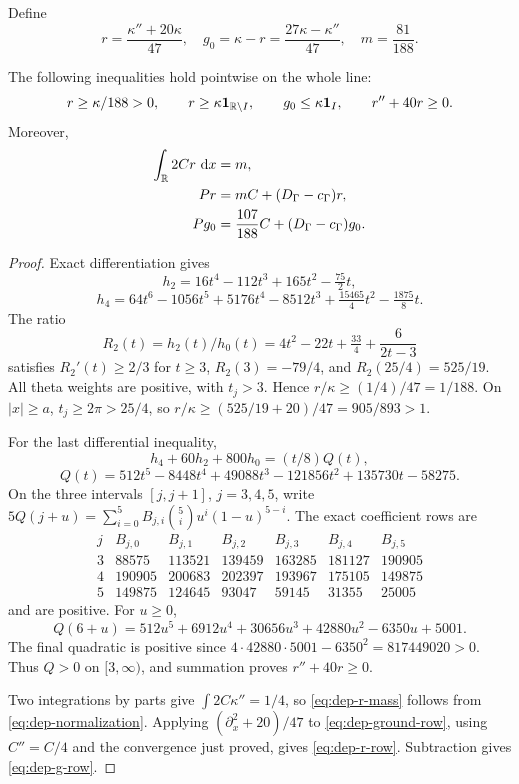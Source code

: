 Define
\[
 r=\frac{\kappa''+20\kappa}{47},\quad
 g_0=\kappa-r=\frac{27\kappa-\kappa''}{47},\quad m=\frac{81}{188}.
\]
\begin{lemma}\label{lem:dep-positive-source}
The following inequalities hold pointwise on the whole line:
\[
 r\ge\kappa/188>0,\qquad r\ge\kappa\mathbf1_{\mathbb R\setminus I},
 \qquad g_0\le\kappa\mathbf1_I,\qquad r''+40r\ge0.
\]
Moreover,
\begin{align}
 \int_{\mathbb R}2Cr\,\,\mathrm d x&=m,\label{eq:dep-r-mass}\\
 Pr&=mC+(D_\Gamma-c_\Gamma)r,\label{eq:dep-r-row}\\
 Pg_0&=\frac{107}{188}C+(D_\Gamma-c_\Gamma)g_0.
 \label{eq:dep-g-row}
\end{align}
\end{lemma}
\begin{proof}
Exact differentiation gives
\[
 h_2=16t^4-112t^3+165t^2-\tfrac{75}{2}t,
\]
\[
 h_4=64t^6-1056t^5+5176t^4-8512t^3
                 +\tfrac{15465}{4}t^2-\tfrac{1875}{8}t.
\]
The ratio
\[
 R_2(t)=h_2(t)/h_0(t)=4t^2-22t+\tfrac{33}{4}+\frac6{2t-3}
\]
satisfies $R_2'(t)\ge2/3$ for $t\ge3$,
$R_2(3)=-79/4$, and $R_2(25/4)=525/19$.
All theta weights are positive, with $t_j>3$. Hence
$r/\kappa\ge(1/4)/47=1/188$.
On $|x|\ge a$, $t_j\ge2\pi>25/4$, so
$r/\kappa\ge(525/19+20)/47=905/893>1$.

For the last differential inequality,
\[
 h_4+60h_2+800h_0=(t/8)Q(t),
\]
\[
 Q(t)=512t^5-8448t^4+49088t^3-121856t^2+135730t-58275.
\]
On the three intervals $[j,j+1]$, $j=3,4,5$, write
$5Q(j+u)=\sum_{i=0}^5 B_{j,i}\binom5i u^i(1-u)^{5-i}$.
The exact coefficient rows are
\[
\begin{array}{c|rrrrrr}
 j& B_{j,0}&B_{j,1}&B_{j,2}&B_{j,3}&B_{j,4}&B_{j,5}\\\hline
3&88575&113521&139459&163285&181127&190905\\
4&190905&200683&202397&193967&175105&149875\\
5&149875&124645&93047&59145&31355&25005
\end{array}
\]
and are positive. For $u\ge0$,
\[
 Q(6+u)=512u^5+6912u^4+30656u^3+42880u^2-6350u+5001.
\]
The final quadratic is positive since
$4\cdot42880\cdot5001-6350^2=817449020>0$.
Thus $Q>0$ on $[3,\infty)$, and summation proves $r''+40r\ge0$.

Two integrations by parts give $\int2C\kappa''=1/4$, so
\eqref{eq:dep-r-mass} follows from \eqref{eq:dep-normalization}.
Applying $(\partial_x^2+20)/47$ to \eqref{eq:dep-ground-row}, using
$C''=C/4$ and the convergence just proved, gives
\eqref{eq:dep-r-row}. Subtraction gives \eqref{eq:dep-g-row}.
\end{proof}

